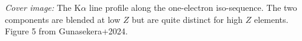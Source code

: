 \documentclass[12pt]{book}
\begin{document}
\clearpage

\vspace{5mm}
\noindent
{\small {\em Cover image:}
The K$\alpha$ line profile along the one-electron iso-sequence.
The two components are blended at low $Z$ but are quite distinct
for high $Z$ elements.
Figure 5 from Gunasekera+2024.
}
\clearpage

\tableofcontents
\listoffigures
\listoftables

\clearpage
\mainmatter

\backmatter


\end{document}
